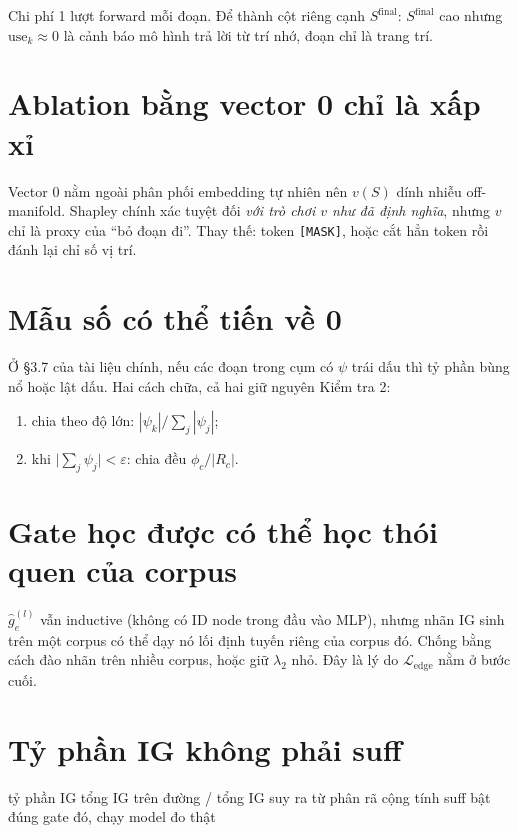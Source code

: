 \documentclass[11pt,a4paper]{article}
\begin{document}
Chi phí 1 lượt forward mỗi đoạn. Để thành cột riêng cạnh $S^{\text{final}}$: $S^{\text{final}}$ cao nhưng $\mathrm{use}_k\approx 0$ là cảnh báo mô hình trả lời từ trí nhớ, đoạn chỉ là trang trí.

\section{Ablation bằng vector 0 chỉ là xấp xỉ}

Vector $0$ nằm ngoài phân phối embedding tự nhiên nên $v(S)$ dính nhiễu off-manifold. Shapley chính xác tuyệt đối \emph{với trò chơi $v$ như đã định nghĩa}, nhưng $v$ chỉ là proxy của ``bỏ đoạn đi''. Thay thế: token \texttt{[MASK]}, hoặc cắt hẳn token rồi đánh lại chỉ số vị trí.

\section{Mẫu số có thể tiến về 0}

Ở \S3.7 của tài liệu chính, nếu các đoạn trong cụm có $\psi$ trái dấu thì tỷ phần bùng nổ hoặc lật dấu. Hai cách chữa, cả hai giữ nguyên Kiểm tra 2:

\begin{enumerate}[nosep,leftmargin=2em]
\item chia theo độ lớn: $|\psi_k|\big/\sum_j|\psi_j|$;
\item khi $\big|\sum_j\psi_j\big|<\varepsilon$: chia đều $\phi_c/|R_c|$.
\end{enumerate}

\section{Gate học được có thể học thói quen của corpus}

$\hat g_e^{(l)}$ vẫn inductive (không có ID node trong đầu vào MLP), nhưng nhãn IG sinh trên một corpus có thể dạy nó lối định tuyến riêng của corpus đó. Chống bằng cách đào nhãn trên nhiều corpus, hoặc giữ $\lambda_2$ nhỏ. Đây là lý do $\mathcal{L}_{\text{edge}}$ nằm ở bước cuối.

\section{Tỷ phần IG không phải suff}
\label{sec:shareVSsuff}

\begin{dia}
tỷ phần IG   tổng IG trên đường / tổng IG    suy ra từ phân rã cộng tính
suff         bật đúng gate đó, chạy model     đo thật
\end{dia}
\end{document}
